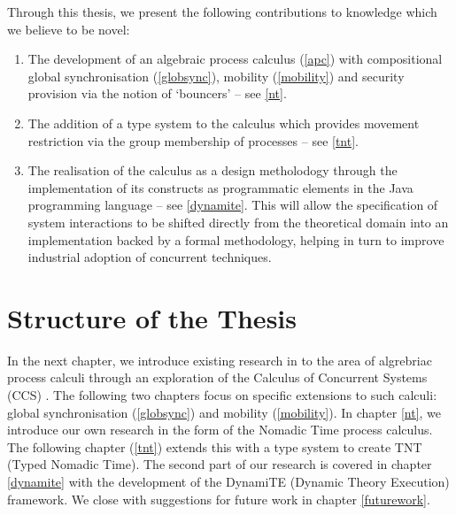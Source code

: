 Through this thesis, we present the following contributions to
knowledge which we believe to be novel:

\begin{enumerate}
\item The development of an algebraic process calculus (\ref{apc})
  with compositional global synchronisation (\ref{globsync}), mobility
  (\ref{mobility}) and security provision via the notion of `bouncers'
  -- see \ref{nt}.
\item The addition of a type system to the calculus which provides
  movement restriction via the group membership of processes -- see
  \ref{tnt}.
\item The realisation of the calculus as a design metholodogy through
  the implementation of its constructs as programmatic elements in the
  Java programming language -- see \ref{dynamite}.  This will allow
  the specification of system interactions to be shifted directly from
  the theoretical domain into an implementation backed by a formal
  methodology, helping in turn to improve industrial adoption of
  concurrent techniques.
\end{enumerate}

\section{Structure of the Thesis}

In the next chapter, we introduce existing research in to the area of
algrebriac process calculi through an exploration of the Calculus of
Concurrent Systems (CCS) \cite{milner:ccs}.  The following two
chapters focus on specific extensions to such calculi: global
synchronisation (\ref{globsync}) and mobility (\ref{mobility}).  In
chapter \ref{nt}, we introduce our own research in the form of the
Nomadic Time process calculus.  The following chapter (\ref{tnt})
extends this with a type system to create TNT (Typed Nomadic Time).
The second part of our research is covered in chapter \ref{dynamite}
with the development of the DynamiTE (Dynamic Theory Execution)
framework.  We close with suggestions for future work in chapter
\ref{futurework}.
